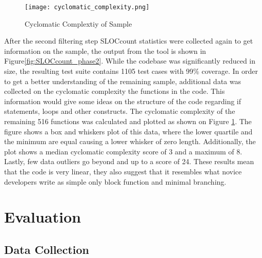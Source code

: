 \begin{figure}[!htb]
	\begin{center}
		\texttt{[image: cyclomatic\_complexity.png]}
		\caption{\label{fig:cyclomatic_complexity_of_sample} Cyclomatic
		Complextiy of Sample}
	\end{center}
\end{figure}

After the second filtering step SLOCcount statistics were collected again to get
information on the sample, the output from the tool is shown in
Figure\ref{fig:SLOCcount_phase2}. While the codebase was significantly reduced in
size, the resulting test suite contains 1105 test cases with 99\% coverage.
In order to get a better understanding of the remaining sample, additional data
was collected on the cyclomatic complexity the functions in the code. This
information would give some ideas on the structure of the code regarding if
statements, loops and other constructs. The cyclomatic complexity of the
remaining 516 functions was calculated and plotted as shown on Figure
\ref{fig:cyclomatic_complexity_of_sample}. The figure shows a box and whiskers
plot of this data, where the lower quartile and the minimum are equal causing a
lower whisker of zero length. Additionally, the plot shows a median cyclomatic
complexity score of 3 and a maximum of 8. Lastly, few data outliers go beyond
and up to a score of 24. These results mean that the code is very linear, they also suggest that it resembles
what novice developers write as simple only block function and minimal branching.

\section{Evaluation}
\label{sec:evaluation}

\subsection{Data Collection}
\label{subsec:data_collection}

